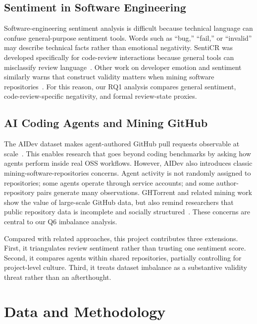 \documentclass[sigconf,nonacm]{acmart}
\begin{document}
\subsection{Sentiment in Software Engineering}

Software-engineering sentiment analysis is difficult because technical language can confuse general-purpose sentiment tools. Words such as ``bug,'' ``fail,'' or ``invalid'' may describe technical facts rather than emotional negativity. SentiCR was developed specifically for code-review interactions because general tools can misclassify review language~\cite{ahmed2017senticr}. Other work on developer emotion and sentiment similarly warns that construct validity matters when mining software repositories~\cite{calefato2018sentiment,ortu2016emotional}. For this reason, our RQ1 analysis compares general sentiment, code-review-specific negativity, and formal review-state proxies.

\subsection{AI Coding Agents and Mining GitHub}

The AIDev dataset makes agent-authored GitHub pull requests observable at scale~\cite{li2026aidev}. This enables research that goes beyond coding benchmarks by asking how agents perform inside real OSS workflows. However, AIDev also introduces classic mining-software-repositories concerns. Agent activity is not randomly assigned to repositories; some agents operate through service accounts; and some author-repository pairs generate many observations. GHTorrent and related mining work show the value of large-scale GitHub data, but also remind researchers that public repository data is incomplete and socially structured~\cite{gousios2013ghtorrent}. These concerns are central to our Q6 imbalance analysis.

Compared with related approaches, this project contributes three extensions. First, it triangulates review sentiment rather than trusting one sentiment score. Second, it compares agents within shared repositories, partially controlling for project-level culture. Third, it treats dataset imbalance as a substantive validity threat rather than an afterthought.

\section{Data and Methodology}
\end{document}
